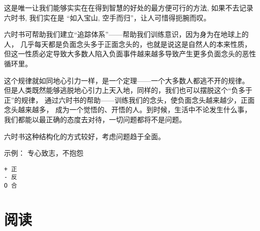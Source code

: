 \begin{tcolorbox}
这是唯一让我们能够实实在在得到智慧的好处的最方便可行的方法, 如果不去记录六时书, 
我们实在是 “如入宝山, 空手而归”，让人可惜得扼腕而叹。

六时书可帮助我们建立“追踪体系”——帮助我们训练意识，因为身为在地球上的人，
几乎每天都是负面念头多于正面念头的，也就是说这是自然人的本来性质，
但这一性质必定导致大多数人陷入负面事件越来越多导致产生更多负面念头的恶性循环里。

这个规律就如同地心引力一样，是一个定理——一个大多数人都逃不开的规律。
但是人类既然能够逃脱地心引力上天入地，同样的，我们也可以摆脱这个“负多于正”的规律，
通过六时书的帮助——训练我们的念头，使负面念头越来越少，正面念头越来越多，
成为一个觉悟的、开悟的人。到时候，生活中不论发生什么事，
我们都能以最正确的态度去对待，一切问题都将不是问题。
\end{tcolorbox}

六时书这种结构化的方式较好，考虑问题趋于全面。

示例： 专心致志，不抱怨

\begin{lstlisting}
+ 正
- 反
O 合
\end{lstlisting}

\section{阅读}
